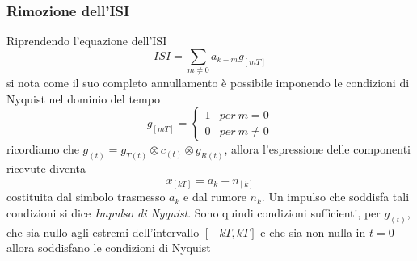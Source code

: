         \subsubsection{Rimozione dell'ISI}
            Riprendendo l'equazione dell'ISI
            \[
                ISI =  \sum_{m\neq 0}a_{k-m}g_{[mT]}
            \]
            si nota come il suo completo annullamento è possibile imponendo le condizioni di Nyquist \label{Condizioni di Nyquist} nel dominio del tempo
            \[
                g_{[mT]} = 
                \begin{cases}
                    1   &per \ m=0\nonumber \\
                    0   &per \ m\neq 0\nonumber
                \end{cases}  
            \]
            ricordiamo che $g_{(t)} = g_{T(t)} \otimes c_{(t)} \otimes g_{R(t)}$, allora l'espressione delle componenti 
            ricevute diventa
            \[
                x_{[kT]} = a_k+n_{[k]}  
            \]
            costituita dal simbolo trasmesso $a_k$ e dal rumore $n_k$. Un impulso che soddisfa tali condizioni si dice \emph{Impulso di Nyquist}.
            Sono quindi condizioni sufficienti, per $g_(t)$, che sia nullo agli estremi dell'intervallo $[-kT,kT]$ e che sia non nulla in $t=0$
            allora soddisfano le condizioni di Nyquist
            \begin{figure}[H]
                \centering
            \end{figure}
